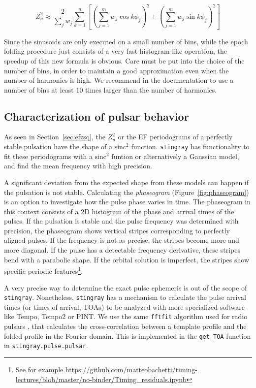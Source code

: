 \documentclass[twocolumn]{aastex62}
\newcommand{\zsq}{\ensuremath{Z^2_n}\xspace}
\newcommand{\stingray}{\texttt{stingray}\xspace}
\begin{document}
\begin{equation}
\zsq \approx \dfrac{2}{\sum_j{w_j}} \sum_{k=1}^n \left[{\left(\sum_{j=1}^m w_j \cos k \phi_j\right)}^2 + {\left(\sum_{j=1}^m w_j \sin k \phi_j\right)}^2\right]
\end{equation}

Since the sinusoids are only executed on a small number of bins, while the epoch folding procedure just consists of a very fast histogram-like operation, the speedup of this new formula is obvious. 
Care must be put into the choice of the number of bins, in order to maintain a good approximation even when the number of harmonics is high. 
We recommend in the documentation to use a number of bins at least 10 times larger than the number of harmonics.

\subsection{Characterization of pulsar behavior}
\label{sec:ephem}
As seen in Section~\ref{sec:efzsq}, the \zsq or the EF periodograms of a perfectly stable pulsation have the shape of a $\mathrm{sinc}^2$ function.
\stingray has functionality to fit these periodograms with a $\mathrm{sinc}^2$ funtion or alternatively a Gaussian model, and find the mean frequency with high precision.

A significant deviation from the expected shape from these models can happen if the pulsation is not stable.
Calculating the \textit{phaseogram} (Figure~\ref{fig:phaseogram}) is an option to investigate how the pulse phase varies in time.
The phaseogram in this context consists of a 2D histogram of the phase and arrival times of the pulses. 
If the pulsation is stable and the pulse frequency was determined with precision, the phaseogram shows vertical stripes corresponding to perfectly aligned pulses.
If the frequency is not as precise, the stripes become more and more diagonal.
If the pulse has a detectable frequency derivative, these stripes bend with a parabolic shape.
If the orbital solution is imperfect, the stripes show specific periodic features\footnote{See for example \url{https://github.com/matteobachetti/timing-lectures/blob/master/no-binder/Timing_residuals.ipynb}}.

A very precise way to determine the exact pulse ephemeris is out of the scope of \stingray. 
Nonetheless, \stingray has a mechanism to calculate the pulse arrival times (or times of arrival, TOAs) to be analyzed with more specialized software like Tempo, Tempo2 or PINT. 
We use the same \texttt{fftfit} algorithm used for radio pulsars \citep{Taylor92}, that calculates the cross-correlation between a template profile and the folded profile in the Fourier domain. 
This is implemented in the \texttt{get\_TOA} function in \texttt{stingray.pulse.pulsar}.
\end{document}
